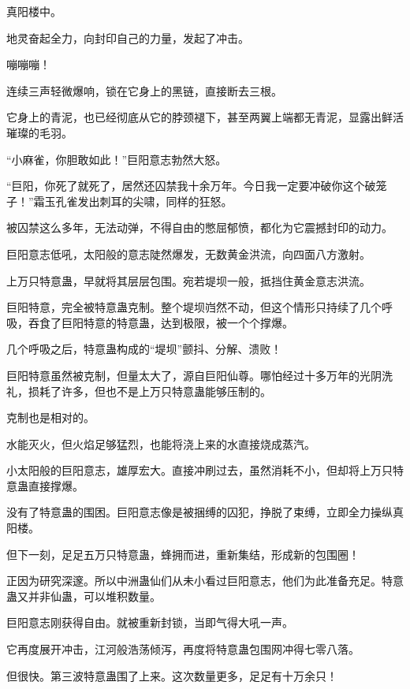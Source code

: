 
\begin{this_body}

真阳楼中。

地灵奋起全力，向封印自己的力量，发起了冲击。

嘣嘣嘣！

连续三声轻微爆响，锁在它身上的黑链，直接断去三根。

它身上的青泥，也已经彻底从它的脖颈褪下，甚至两翼上端都无青泥，显露出鲜活璀璨的毛羽。

“小麻雀，你胆敢如此！”巨阳意志勃然大怒。

“巨阳，你死了就死了，居然还囚禁我十余万年。今日我一定要冲破你这个破笼子！”霜玉孔雀发出刺耳的尖啸，同样的狂怒。

被囚禁这么多年，无法动弹，不得自由的憋屈郁愤，都化为它震撼封印的动力。

巨阳意志低吼，太阳般的意志陡然爆发，无数黄金洪流，向四面八方激射。

上万只特意蛊，早就将其层层包围。宛若堤坝一般，抵挡住黄金意志洪流。

巨阳特意，完全被特意蛊克制。整个堤坝岿然不动，但这个情形只持续了几个呼吸，吞食了巨阳特意的特意蛊，达到极限，被一个个撑爆。

几个呼吸之后，特意蛊构成的“堤坝”颤抖、分解、溃败！

巨阳特意虽然被克制，但量太大了，源自巨阳仙尊。哪怕经过十多万年的光阴洗礼，损耗了许多，但也不是上万只特意蛊能够压制的。

克制也是相对的。

水能灭火，但火焰足够猛烈，也能将浇上来的水直接烧成蒸汽。

小太阳般的巨阳意志，雄厚宏大。直接冲刷过去，虽然消耗不小，但却将上万只特意蛊直接撑爆。

没有了特意蛊的围困。巨阳意志像是被捆缚的囚犯，挣脱了束缚，立即全力操纵真阳楼。

但下一刻，足足五万只特意蛊，蜂拥而进，重新集结，形成新的包围圈！

正因为研究深邃。所以中洲蛊仙们从未小看过巨阳意志，他们为此准备充足。特意蛊又并非仙蛊，可以堆积数量。

巨阳意志刚获得自由。就被重新封锁，当即气得大吼一声。

它再度展开冲击，江河般浩荡倾泻，再度将特意蛊包围网冲得七零八落。

但很快。第三波特意蛊围了上来。这次数量更多，足足有十万余只！


\end{this_body}
